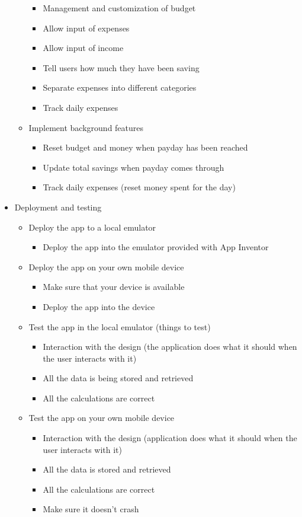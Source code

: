 \begin{itemize}
\begin{itemize}
    \begin{itemize}
      \item Management and customization of budget
      \item Allow input of expenses
      \item Allow input of income
      \item Tell users how much they have been saving
      \item Separate expenses into different categories
      \item Track daily expenses
    \end{itemize}
    \item Implement background features
    \begin{itemize}
      \item Reset budget and money when payday has been reached
      \item Update total savings when payday comes through
      \item Track daily expenses (reset money spent for the day)
    \end{itemize}
  \end{itemize}
  \item Deployment and testing
  \begin{itemize}
    \item Deploy the app to a local emulator
    \begin{itemize}
      \item Deploy the app into the emulator provided with App Inventor
    \end{itemize}
    \item Deploy the app on your own mobile device
    \begin{itemize}
      \item Make sure that your device is available
      \item Deploy the app into the device
    \end{itemize}
    \item Test the app in the local emulator (things to test)
    \begin{itemize}
      \item Interaction with the design (the application does what it should when the user interacts with it)
      \item All the data is being stored and retrieved
      \item All the calculations are correct
    \end{itemize}
    \item Test the app on your own mobile device
    \begin{itemize}
      \item Interaction with the design (application does what it should when the user interacts with it)
      \item All the data is stored and retrieved
      \item All the calculations are correct
      \item Make sure it doesn't crash
    \end{itemize}
  \end{itemize}
\end{itemize}


